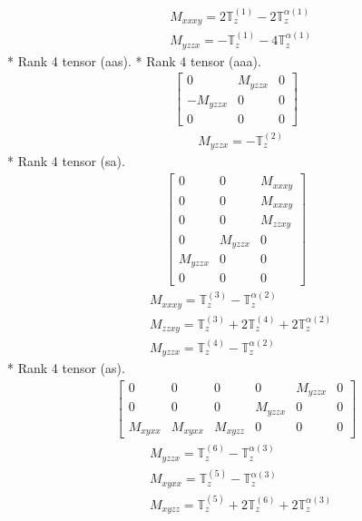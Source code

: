 \documentclass[fleqn,8pt,landscape]{jsarticle}
\begin{document}
\begin{align*}
& M_{xxxy} = 2 \mathbb{T}_{z}^{(1)} - 2 \mathbb{T}_{z}^{\alpha(1)} \\
& M_{yzzx} = - \mathbb{T}_{z}^{(1)} - 4 \mathbb{T}_{z}^{\alpha(1)}
\end{align*}
* Rank 4 tensor (aas).
* Rank 4 tensor (aaa).
\begin{align*}
\begin{bmatrix} 0 & M_{yzzx} & 0 \\ - M_{yzzx} & 0 & 0 \\ 0 & 0 & 0 \end{bmatrix}
\end{align*}
\begin{align*}
& M_{yzzx} = - \mathbb{T}_{z}^{(2)}
\end{align*}
* Rank 4 tensor (sa).
\begin{align*}
\begin{bmatrix} 0 & 0 & M_{xxxy} \\ 0 & 0 & M_{xxxy} \\ 0 & 0 & M_{zzxy} \\ 0 & M_{yzzx} & 0 \\ M_{yzzx} & 0 & 0 \\ 0 & 0 & 0 \end{bmatrix}
\end{align*}
\begin{align*}
& M_{xxxy} = \mathbb{T}_{z}^{(3)} - \mathbb{T}_{z}^{\alpha(2)} \\
& M_{zzxy} = \mathbb{T}_{z}^{(3)} + 2 \mathbb{T}_{z}^{(4)} + 2 \mathbb{T}_{z}^{\alpha(2)} \\
& M_{yzzx} = \mathbb{T}_{z}^{(4)} - \mathbb{T}_{z}^{\alpha(2)}
\end{align*}
* Rank 4 tensor (as).
\begin{align*}
\begin{bmatrix} 0 & 0 & 0 & 0 & M_{yzzx} & 0 \\ 0 & 0 & 0 & M_{yzzx} & 0 & 0 \\ M_{xyxx} & M_{xyxx} & M_{xyzz} & 0 & 0 & 0 \end{bmatrix}
\end{align*}
\begin{align*}
& M_{yzzx} = \mathbb{T}_{z}^{(6)} - \mathbb{T}_{z}^{\alpha(3)} \\
& M_{xyxx} = \mathbb{T}_{z}^{(5)} - \mathbb{T}_{z}^{\alpha(3)} \\
& M_{xyzz} = \mathbb{T}_{z}^{(5)} + 2 \mathbb{T}_{z}^{(6)} + 2 \mathbb{T}_{z}^{\alpha(3)}
\end{align*}
\end{document}
